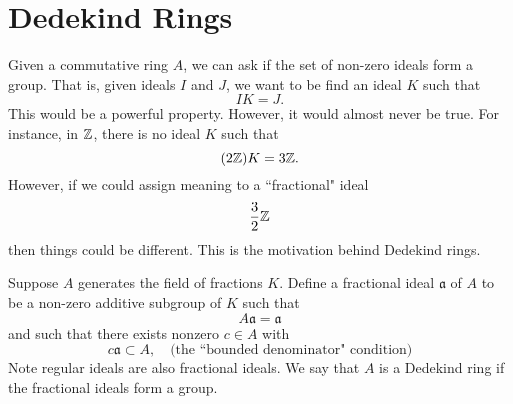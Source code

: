 \section{Dedekind Rings}
Given a commutative ring $A$, we can ask if the set of non-zero ideals form a group. That is, given ideals $I$ and $J$, we want to be find an ideal $K$ such that
\[
    IK = J.
\]
This would be a powerful property. However, it would almost never be true. For instance, in ${\mathbb Z}$, there is no ideal $K$ such that
\[
    (2{\mathbb Z})K = 3{\mathbb Z}.
\]
However, if we could assign meaning to a ``fractional" ideal
\[
    \frac{3}{2}{\mathbb Z}
\]
then things could be different. This is the motivation behind Dedekind rings.

Suppose $A$ generates the field of fractions $K$. Define a fractional ideal $\mathfrak a$ of $A$ to be a non-zero additive subgroup of $K$ such that
\[
    A\mathfrak a = \mathfrak a
\]
and such that there exists nonzero $c \in A$ with
\[
    c\mathfrak a \subset A, \quad \text{(the ``bounded denominator" condition)}
\]
Note regular ideals are also fractional ideals. We say that $A$ is a Dedekind ring if the fractional ideals form a group.
